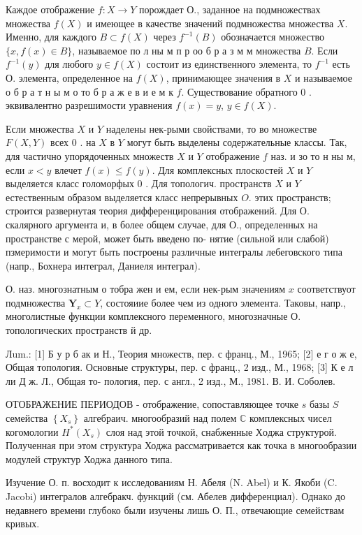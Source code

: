 \documentclass[10pt]{article}
\begin{document}
Каждое отображение $f: X \rightarrow Y$ порождает О., заданное на подмножествах множества $f(X)$ и имеющее в качестве значений подмножества множества $X$. Именно, для каждого $B \subset f(X)$ через $f^{-1}(B)$ обозначается множество $\{x, f(x) \in B\}$, называемое по л ны м п р оо б р а з м м множества $B$. Если $f^{-1}(y)$ для любого $y \in f(X)$ состоит из единственного элемента, то $f^{-1}$ есть $О$. элемента, определенное на $f(X)$, принимающее значения в $X$ и называемое о $б$ р а т н ы м о то б р а ж е в и е м к $f$. Существование обратного 0 . эквивалентно разрешимости уравнения $f(x)=y$, $y \in f(X)$.

Если множества $X$ и $Y$ наделены нек-рыми свойствами, то во множестве $F(X, Y)$ всех 0 . на $X$ в $Y$ могут быть выделены содержательные классы. Так, для частично упорядоченных множеств $X$ и $Y$ отображение $f$ наз. и зо то н ны м, если $x<y$ влечет $f(x) \leqslant f(y)$. Для комплексных плоскостей $X$ и $Y$ выделяется класс голоморфых 0 . Для топологич. пространств $X$ и $Y$ естественным образом выделяется класс непрерывных $O$. этих пространств; строится развернутая теория дифференцирования отображений. Для О. скалярного аргумента и, в более общем случае, для О., определенных на пространстве с мерой, может быть введено по- нятие (сильной или слабой) пзмеримости и могут быть построены различные интегралы лебеговского типа (напр., Бохнера интеграл, Даниеля интеграл).

О. наз. многознатным о тобра жен и ем, если нек-рым значениям $x$ соответствуот подмножества $\boldsymbol{Y}_{x} \subset Y$, состояиие более чем из одного элемента. Таковы, напр., многолистные функции комплексного переменного, многозначные О. топологических пространств й др.

Лum.: [1] Б у р б ак и Н., Теория множеств, пер. с франц., М., 1965; [2] е г о ж е, Общая топология. Основные структуры, пер. с франц., 2 изд., М., 1968; [3] К е л ли Д ж. Л., Общая то-
пология, пер. с англ., 2 изд., М., 1981.
В. И. Соболев.

ОТОБРАЖЕНИЕ ПЕРИОДОВ - отображение, сопоставляющее точке $s$ базы $S$ семейства $\left\{X_{s}\right\}$ алгебраич. многообразий над полем $\mathbb{C}$ комплексных чисел когомологии $H^{*}\left(X_{s}\right)$ слоя над этой точкой, снабженные $Х о д ж а$ структурой. Полученная при этом структура Ходжа рассматривается как точка в многообразии модулей структур Ходжа данного типа.

Изучение О. п. восходит к исследованиям Н. Абеля (N. Abel) и К. Якоби (C. Jacobi) интегралов алгебракч. функций (см. Абелев дифференциал). Однако до недавнего времени глубоко были изучены лишь О. П., отвечающие семействам кривых.
\end{document}
